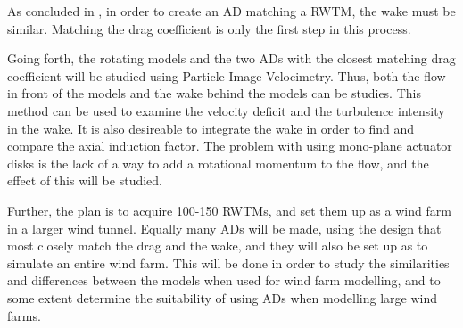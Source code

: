 As concluded in \cite{}, in order to create an \gls{AD} matching a \gls{RWTM}, the wake must be similar. Matching the drag coefficient is only the first step in this process. 

Going forth, the rotating models and the two \gls{AD}s with the closest matching drag coefficient will be studied using Particle Image Velocimetry. Thus, both the flow in front of the models and the wake behind the models can be studies. This method can be used to examine the velocity deficit and the turbulence intensity in the wake. It is also desireable to integrate the wake in order to find and compare the axial induction factor. The problem with using mono-plane actuator disks is the lack of a way to add a rotational momentum to the flow, and the effect of this will be studied. 

Further, the plan is to acquire 100-150 \gls{RWTM}s, and set them up as a wind farm in a larger wind tunnel. Equally many \gls{AD}s will be made, using the design that most closely match the drag and the wake, and they will also be set up as to simulate an entire wind farm. This will be done in order to study the similarities and differences between the models when used for wind farm modelling, and to some extent determine the suitability of using \gls{AD}s when modelling large wind farms. 





